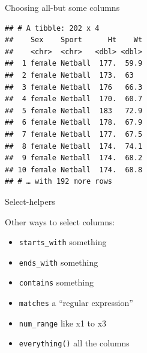 \documentclass[
  ignorenonframetext,
]{beamer}
\newenvironment{Shaded}{\begin{snugshade}}{\end{snugshade}}
\newcommand{\KeywordTok}[1]{\textcolor[rgb]{0.13,0.29,0.53}{\textbf{#1}}}
\newcommand{\NormalTok}[1]{#1}
\newcommand{\OperatorTok}[1]{\textcolor[rgb]{0.81,0.36,0.00}{\textbf{#1}}}
\newcommand{\StringTok}[1]{\textcolor[rgb]{0.31,0.60,0.02}{#1}}
\providecommand{\tightlist}{%
  \setlength{\itemsep}{0pt}\setlength{\parskip}{0pt}}
\begin{document}
\begin{frame}[fragile]{Choosing all-but some columns}
\protect\hypertarget{choosing-all-but-some-columns}{}

\begin{Shaded}
\end{Shaded}

\begin{verbatim}
## # A tibble: 202 x 4
##    Sex    Sport      Ht    Wt
##    <chr>  <chr>   <dbl> <dbl>
##  1 female Netball  177.  59.9
##  2 female Netball  173.  63  
##  3 female Netball  176   66.3
##  4 female Netball  170.  60.7
##  5 female Netball  183   72.9
##  6 female Netball  178.  67.9
##  7 female Netball  177.  67.5
##  8 female Netball  174.  74.1
##  9 female Netball  174.  68.2
## 10 female Netball  174.  68.8
## # … with 192 more rows
\end{verbatim}

\end{frame}

\begin{frame}[fragile]{Select-helpers}
\protect\hypertarget{select-helpers}{}

Other ways to select columns:

\begin{itemize}
\tightlist
\item
  \texttt{starts\_with} something
\item
  \texttt{ends\_with} something
\item
  \texttt{contains} something
\item
  \texttt{matches} a ``regular expression''
\item
  \texttt{num\_range} like x1 to x3
\item
  \texttt{everything()} all the columns
\end{itemize}

\end{frame}
\end{document}
